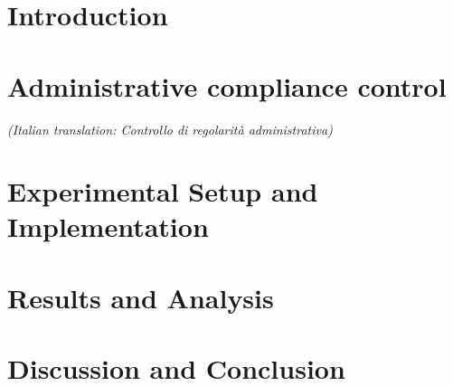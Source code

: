 \maketitle
\frontmatter


\tableofcontents
\mainmatter




\chapter{Introduction}

 
\chapter{Administrative compliance control}
\textit{(Italian translation: Controllo di regolarità administrativa)}


\chapter{Experimental Setup and Implementation}
 

\chapter{Results and Analysis}


\chapter{Discussion and Conclusion}






%


\cleardoublepage 


